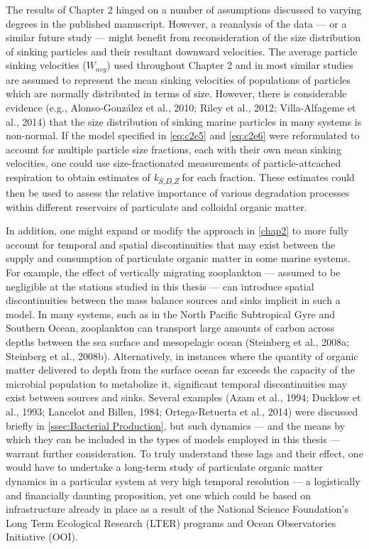 The results of Chapter 2 hinged on a number of assumptions discussed to varying degrees in the published manuscript. However, a reanalysis of the data --- or a similar future study --- might benefit from reconsideration of the size distribution of sinking particles and their resultant downward velocities. The average particle sinking velocities ($W_{avg}$) used throughout Chapter 2 and in most similar studies are assumed to represent the mean sinking velocities of populations of particles which are normally distributed in terms of size. However, there is considerable evidence (e.g., Alonso-Gonz\'{a}lez et al., 2010; Riley et al., 2012; Villa-Alfageme et al., 2014) that the size distribution of sinking marine particles in many systems is non-normal. If the model specified in \autoref{eq:c2e5} and \autoref{eq:c2e6} were reformulated to account for multiple particle size fractions, each with their own mean sinking velocities, one could use size-fractionated measurements of particle-attcached respiration to obtain estimates of \emph{k\textsubscript{S}}\textsubscript{,\emph{D},\emph{Z}} for each fraction. These estimates could then be used to assess the relative importance of various degradation processes within different reservoirs of particulate and colloidal organic matter.

In addition, one might expand or modify the approach in \autoref{chap2} to more fully account for temporal and spatial discontinuities that may exist between the supply and consumption of particulate organic matter in some marine systems. For example, the effect of vertically migrating zooplankton --- assumed to be negligible at the stations studied in this thesis --- can introduce spatial discontinuities between the mass balance sources and sinks implicit in such a model. In many systems, such as in the North Pacific Subtropical Gyre and Southern Ocean, zooplankton can transport large amounts of carbon across depths between the sea surface and mesopelagic ocean (Steinberg et al., 2008a; Steinberg et al., 2008b). Alternatively, in instances where the quantity of organic matter delivered to depth from the surface ocean far exceeds the capacity of the microbial population to metabolize it, significant temporal discontinuities may exist between sources and sinks. Several examples (Azam et al., 1994; Ducklow et al., 1993; Lancelot and Billen, 1984; Ortega-Retuerta et al., 2014) were discussed briefly in \autoref{ssec:Bacterial Production}, but such dynamics --- and the means by which they can be included in the types of models employed in this thesis --- warrant further consideration. To truly understand these lags and their effect, one would have to undertake a long-term study of particulate organic matter dynamics in a particular system at very high temporal resolution --- a logistically and financially daunting proposition, yet one which could be based on infrastructure already in place as a result of the National Science Foundation's Long Term Ecological Research (LTER) programs and Ocean Observatories Initiative (OOI).

